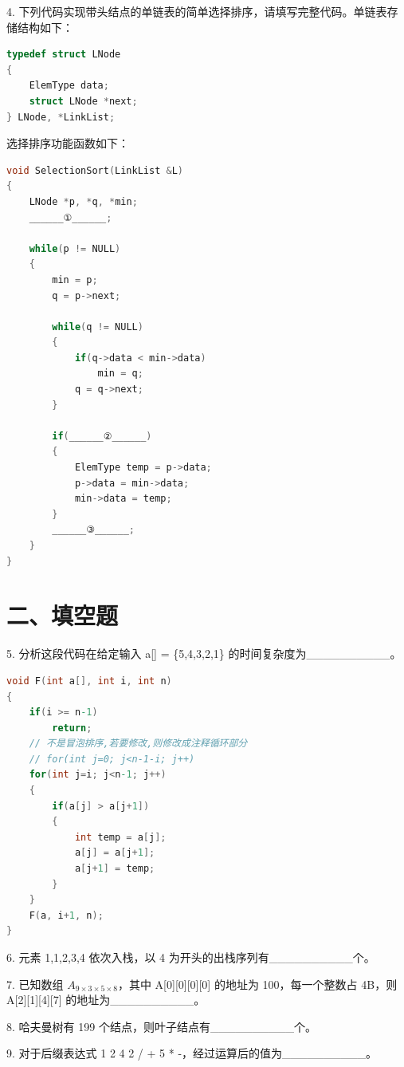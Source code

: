 4. 下列代码实现带头结点的单链表的简单选择排序，请填写完整代码。单链表存储结构如下：

\begin{lstlisting}[language=C, basicstyle=\ttfamily]
typedef struct LNode
{
    ElemType data;
    struct LNode *next;
} LNode, *LinkList;
\end{lstlisting}

选择排序功能函数如下：

\begin{lstlisting}[language=C, basicstyle=\ttfamily]
void SelectionSort(LinkList &L)
{
    LNode *p, *q, *min;
    ______①______;

    while(p != NULL)
    {
        min = p;
        q = p->next;

        while(q != NULL)
        {
            if(q->data < min->data)
                min = q;
            q = q->next;
        }

        if(______②______)
        {
            ElemType temp = p->data;
            p->data = min->data;
            min->data = temp;
        }
        ______③______;
    }
}
\end{lstlisting}

\section*{二、填空题}

5. 分析这段代码在给定输入 a[] = \{5,4,3,2,1\} 的时间复杂度为\_\_\_\_\_\_\_\_\_\_。

\begin{lstlisting}[language=C, basicstyle=\ttfamily]
void F(int a[], int i, int n)
{
    if(i >= n-1)
        return;
    // 不是冒泡排序,若要修改,则修改成注释循环部分
    // for(int j=0; j<n-1-i; j++)
    for(int j=i; j<n-1; j++)
    {
        if(a[j] > a[j+1])
        {
            int temp = a[j];
            a[j] = a[j+1];
            a[j+1] = temp;
        }
    }
    F(a, i+1, n);
}
\end{lstlisting}

6. 元素 1,1,2,3,4 依次入栈，以 4 为开头的出栈序列有\_\_\_\_\_\_\_\_\_\_个。

7. 已知数组 \(A_{9\times 3\times 5\times 8}\)，其中 A[0][0][0][0] 的地址为 100，每一个整数占 4B，则 A[2][1][4][7] 的地址为\_\_\_\_\_\_\_\_\_\_。

8. 哈夫曼树有 199 个结点，则叶子结点有\_\_\_\_\_\_\_\_\_\_个。

9. 对于后缀表达式 1 2 4 2 / + 5 * -，经过运算后的值为\_\_\_\_\_\_\_\_\_\_。

